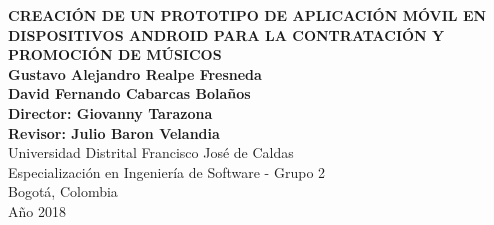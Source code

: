 \begin{center}
\begin{figure}
\centering%
%
\end{figure}
\thispagestyle{empty}  \textbf{ \LARGE
CREACIÓN DE UN PROTOTIPO DE APLICACIÓN MÓVIL EN 
DISPOSITIVOS ANDROID PARA LA CONTRATACIÓN Y PROMOCIÓN DE MÚSICOS 
}\\[2cm]
\Large\textbf{Gustavo Alejandro Realpe Fresneda}\\
\Large\textbf{David Fernando Cabarcas Bolaños}\\[2.0cm]

\large\textbf{Director: Giovanny Tarazona}\\
\large\textbf{Revisor: Julio Baron Velandia}\\[3.5cm]


\small Universidad Distrital Francisco Jos\'{e} de Caldas\\
Especialización en Ingeniería de Software - Grupo 2\\
Bogotá, Colombia\\
A\~{n}o 2018\\
\end{center}

